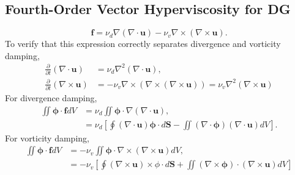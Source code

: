 \documentclass{article}
\newcommand{\vb}{\mathbf}
\newcommand{\vg}{\boldsymbol}
\newcommand{\pdiff}[2]{\frac{\partial #1}{\partial #2}}
\begin{document}
\subsection{Fourth-Order Vector Hyperviscosity for DG}
\begin{equation}
\vb{f} = \nu_d \nabla (\nabla \cdot \vb{u}) - \nu_v \nabla \times (\nabla \times \vb{u}).
\end{equation}  To verify that this expression correctly separates divergence and vorticity damping,
\begin{align}
\pdiff{}{t} (\nabla \cdot \vb{u}) &= \nu_d \nabla^2 (\nabla \cdot \vb{u}), \\
\pdiff{}{t} (\nabla \times \vb{u}) &= - \nu_v \nabla \times (\nabla \times (\nabla \times \vb{u})) = \nu_v \nabla^2 (\nabla \times \vb{u})
\end{align}  For divergence damping,
\begin{align}
\iint \vg{\phi} \cdot \vb{f} dV &= \nu_d \iint \vg{\phi} \cdot \nabla (\nabla \cdot \vb{u}), \\
&= \nu_d \left[ \oint (\nabla \cdot \vb{u}) \vg{\phi} \cdot d\vb{S} - \iint (\nabla \cdot \vg{\phi}) (\nabla \cdot \vb{u}) dV \right].
\end{align}  For vorticity damping,
\begin{align}
\iint \vg{\phi} \cdot \vb{f} dV &= - \nu_v \iint \vg{\phi} \cdot \nabla \times (\nabla \times \vb{u}) dV, \\
&= - \nu_v \left[ \oint (\nabla \times \vb{u}) \times \phi \cdot d\vb{S} + \iint (\nabla \times \vg{\phi}) \cdot (\nabla \times \vb{u}) dV \right]
\end{align}

\end{document}
